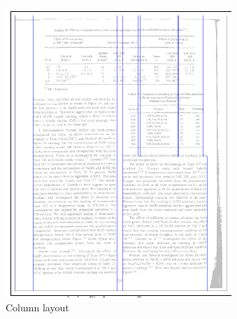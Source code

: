 \begin{figure}[t]
\hspace*{\fill} 
\begin{subfigure}{0.31\textwidth}
\includegraphics[width=\linewidth]{img/tableDetection/tableDetectionColumns.pdf}
\caption{Column layout}
\label{fig:tessTableDet1}
\end{subfigure}
\hspace*{\fill}
\begin{subfigure}{0.31\textwidth}

\end{subfigure}
\end{figure}
